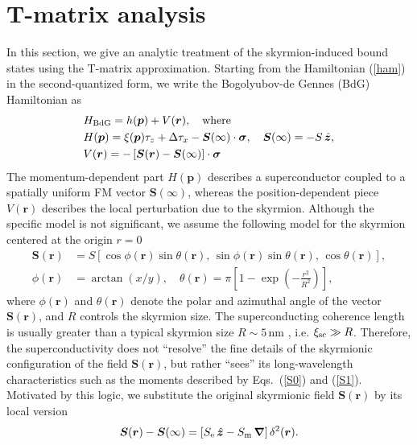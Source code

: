 \documentclass[twocolumn,showpacs,floatfix,longbibliography]{revtex4-1}
\begin{document}
\section{T-matrix analysis} \label{sec:appendixTMatrix}


In this section, we give an analytic treatment of the skyrmion-induced bound states using the T-matrix approximation. Starting from the Hamiltonian (\ref{ham}) in the second-quantized form, we write the Bogolyubov-de Gennes (BdG) Hamiltonian as 
\begin{align}
	& H_{\rm BdG} = h(\bm p) + V(\bm r),\quad {\rm where}  \label{hbdg} \\
& H(\bm p) = \xi(\bm p)\tau_z+\Delta \tau_x - \bm S(\infty)\cdot\bm\sigma,\quad \bm S(\infty) = -S\,\hat{\bm z}, \nonumber\\
& V(\bm r) = -\left[ \bm S(\bm r)-\bm S(\infty)\right]\cdot\bm\sigma \label{v0}
\end{align}
The momentum-dependent part $H(\bm p)$ describes a superconductor coupled to a spatially uniform FM vector $\bm S(\infty)$, whereas the position-dependent piece $V(\bm r)$ describes the local perturbation due to the skyrmion. Although the specific model is not significant, we assume the following model for the skyrmion centered at the origin $r=0$
\begin{align}
	\bm S(\bm r) &= S\left[ \cos\phi(\bm r) \sin\theta(\bm r),\, \sin\phi(\bm r)\sin\theta(\bm r),\,\cos\theta(\bm r)\right], \nonumber \\   
	\phi(\bm r) &= \arctan(x/y),\quad \theta(\bm r) = \pi \left[ 1-\exp\left( -\frac{r^2}{R^2} \right) \right], 	\label{sr}
\end{align}
where $\phi(\bm r)$ and $\theta(\bm r)$ denote the polar and azimuthal angle of the vector $\bm S(\bm r)$, and $R$ controls the skyrmion size. The superconducting coherence length is usually greater than a typical skyrmion size $R\sim 5$\,nm \cite{Heinze2011,Romming2013,Bergmann2014,Brede2014,Sonntag2014,vonBergmann2015,Romming2015}, i.e. $\xi_{\rm sc}\gg R$. Therefore, the superconductivity does not ``resolve'' the fine details of the skyrmionic configuration of the field  $\bm S(\bm r)$, but rather ``sees'' its long-wavelength characteristics such as the moments described by Eqs.~(\ref{S0}) and (\ref{S1}). Motivated by this logic, we substitute the original skyrmionic field $\bm S(\bm r)$ by its local version 
\begin{equation}
	\bm S(\bm r) - \bm S(\infty) = \left[ S_{\rm e}\, \hat{\bm z} - S_{\rm m}\, \bm \nabla\right] \delta^2(\bm r).
	\label{S}
\end{equation}
\end{document}
